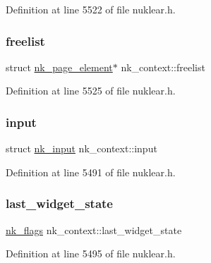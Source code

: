 Definition at line 5522 of file nuklear.\+h.

\mbox{\label{structnk__context_aa66b352c5a05615e844a4e065186aa85}} 
\subsubsection{\texorpdfstring{freelist}{freelist}}
{\footnotesize\ttfamily struct \mbox{\hyperlink{structnk__page__element}{nk\+\_\+page\+\_\+element}}$\ast$ nk\+\_\+context\+::freelist}



Definition at line 5525 of file nuklear.\+h.

\mbox{\label{structnk__context_abee1c200e8e185fe718556c0ddff31ad}} 
\subsubsection{\texorpdfstring{input}{input}}
{\footnotesize\ttfamily struct \mbox{\hyperlink{structnk__input}{nk\+\_\+input}} nk\+\_\+context\+::input}



Definition at line 5491 of file nuklear.\+h.

\mbox{\label{structnk__context_a15a7e828c4fb1ac317c72f00ff278b95}} 
\subsubsection{\texorpdfstring{last\+\_\+widget\+\_\+state}{last\_widget\_state}}
{\footnotesize\ttfamily \mbox{\hyperlink{nuklear_8h_a19e0e2f6db4862891d9801de3c3da323}{nk\+\_\+flags}} nk\+\_\+context\+::last\+\_\+widget\+\_\+state}



Definition at line 5495 of file nuklear.\+h.

\mbox{\label{structnk__context_a678e6980553a5f32f7b59f2fbcebebe9}} 
